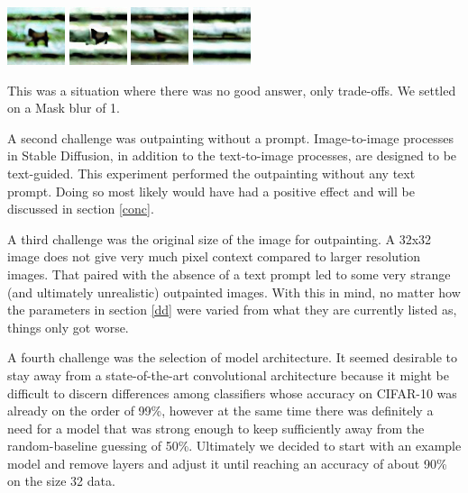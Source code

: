 \documentclass[conference]{IEEEtran}
\begin{document}
\includegraphics[scale=0.9]{h264-1.png}
\includegraphics[scale=0.9]{h264-2.png}
\includegraphics[scale=0.9]{h264-3.png}
\includegraphics[scale=0.9]{h264-4.png}

This was a situation where there was no good answer, only trade-offs. We settled on a Mask blur of 1.

A second challenge was outpainting without a prompt. Image-to-image processes in Stable Diffusion, in addition to the text-to-image processes, are designed to be text-guided. This experiment performed the outpainting without any text prompt. Doing so most likely would have had a positive effect and will be discussed in section \ref{conc}.

A third challenge was the original size of the image for outpainting. A 32x32 image does not give very much pixel context compared to larger resolution images. That paired with the absence of a text prompt led to some very strange (and ultimately unrealistic) outpainted images. With this in mind, no matter how the parameters in section \ref{dd} were varied from what they are currently listed as, things only got worse.

A fourth challenge was the selection of model architecture. It seemed desirable to stay away from a state-of-the-art convolutional architecture because it might be difficult to discern differences among classifiers whose accuracy on CIFAR-10 was already on the order of 99\%, however at the same time there was definitely a need for a model that was strong enough to keep sufficiently away from the random-baseline guessing of 50\%. Ultimately we decided to start with an example model and remove layers and adjust it until reaching an accuracy of about 90\% on the size 32 data.
\end{document}
